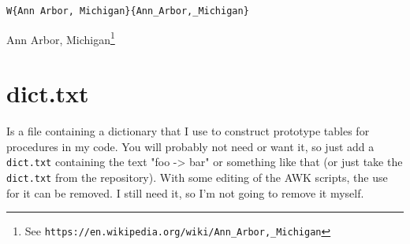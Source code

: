\begin{verbatim}
W{Ann Arbor, Michigan}{Ann_Arbor,_Michigan}
\end{verbatim}

Ann Arbor, Michigan\footnote{See \texttt{https://en.wikipedia.org/wiki/Ann\_Arbor,\_Michigan}}

\section{dict.txt}
\label{dicttxt}

Is a file containing a dictionary that I use to construct prototype tables for procedures in my code. You will probably not need or want it, so just add a \texttt{dict.txt} containing the text "foo -> bar" or something like that (or just take the \texttt{dict.txt} from the repository). With some editing of the AWK scripts, the use for it can be removed. I still need it, so I'm not going to remove it myself.


